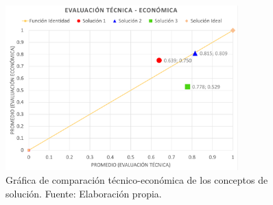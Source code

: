 \begin{figure}[H]
	\centering
	\includegraphics[width=0.8\textwidth]{img/comp_tecnico_economica.pdf}
	\caption[Gráfica de comparación técnico-económica de los conceptos de solución.]{Gráfica de comparación técnico-económica de los conceptos de solución. Fuente: Elaboración propia.}
	\label{fig:comp_tecnico_economica}
\end{figure}
